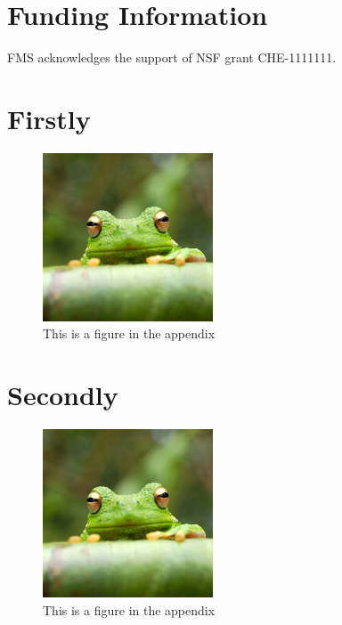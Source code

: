 \documentclass[9pt,bestpractices]{livecoms}
\begin{document}
\section{Funding Information}
FMS acknowledges the support of NSF grant CHE-1111111.

\nocite{*} %



\appendix

\section{Firstly}\label{first:app}
\lipsum[1]

\begin{figure}[bt!]
\centering
\includegraphics[width=\linewidth,height=5cm]{frog}
\caption{This is a figure in the appendix}
\label{fig:app}
\end{figure}

\section{Secondly}

\lipsum[5-8]

\begin{figure}[hbt!]
\centering
\includegraphics[width=\linewidth,height=5cm]{frog}
\caption{This is a figure in the appendix}
\end{figure}
\end{document}
